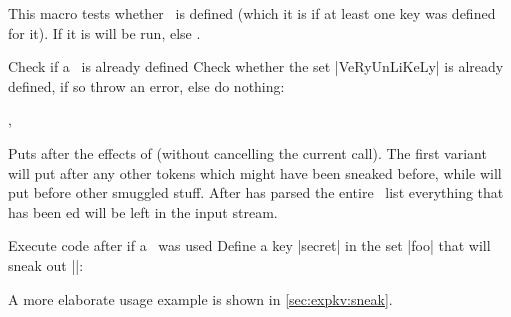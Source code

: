 \begin{function}{\ekvifdefinedset}
  \begin{syntax}
  \end{syntax}
  This macro tests whether \set\ is defined (which it is if at least one key was
  defined for it). If it is  will be run, else .
\end{function}
\begin{example}{Check if a \set\ is already defined}
  Check whether the set |VeRyUnLiKeLy| is already defined, if so throw an error,
  else do nothing:
  \begin{enverb}[no-tcb]
      {}{}
  \end{enverb}
\end{example}

\begin{function}{\ekvsneak,\ekvsneakPre}
  \begin{syntax}
  \end{syntax}
  Puts  after the effects of  (without cancelling the
  current  call). The first variant will put  after any
  other tokens which might have been sneaked before, while  will
  put  before other smuggled stuff. After  has parsed the
  entire \kv\ list everything that has been ed will be left in the
  input stream.
\end{function}
\begin{example}{Execute code after  if a \Nkey\ was used}
  Define a key |secret| in the set |foo| that will sneak out
  |\foo@secretly@sneaked|:
  \begin{enverb}[no-tcb]
  \end{enverb}
\end{example}
A more elaborate usage example is shown in \autoref{sec:expkv:sneak}.

